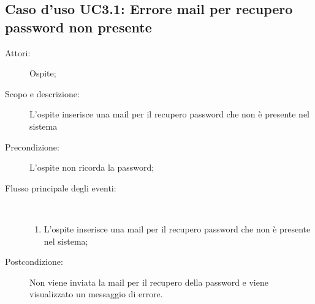 \subsection{Caso d'uso UC3.1: Errore mail per recupero password non presente}\begin{description}
\item[Attori:] Ospite;
\item[Scopo e descrizione:] L'ospite inserisce una mail per il recupero password che non è presente nel sistema
      \item[Precondizione:] L'ospite non ricorda la password;

        \item[Flusso principale degli eventi:] \ 
 \begin{enumerate}
          \item L'ospite inserisce una mail per il recupero password che non è presente nel sistema;

      \end{enumerate}
    \item[Postcondizione:] Non viene inviata la mail per il recupero della password e viene visualizzato un messaggio di errore.
  \end{description}
\hypertarget{UC4}{}
